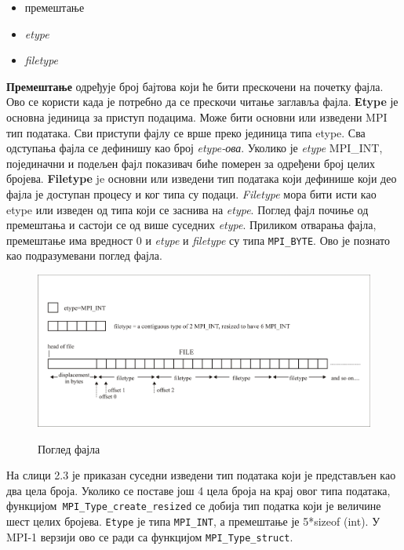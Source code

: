 \begin{itemize}
\item премештање
\item \textit{etype}
\item \textit{filetype}
\end{itemize}

\textbf{Премештање} одређује број бајтова који ће бити прескочени на почетку фајла. Ово се користи када је потребно да се прескочи читање заглавља фајла.
\textbf{Еtype} је основна јединица за приступ подацима. Може бити основни или изведени MPI тип података. Сви приступи фајлу се врше преко јединица типа etype. Сва одступања фајла се дефинишу као број \textit{ etype-ова}. Уколико је \textit{etype} MPI\_INT, појединачни и подељен фајл показивач биће померен за одређени број целих бројева.
\textbf{Filetype} je основни или изведени тип података који дефинише који део фајла је доступан процесу и ког типа су подаци. \textit{Filetype} мора бити исти као etype или изведен од типа који се заснива на \textit{etype}.
Поглед фајл почиње од премештања и састоји се од више суседних \textit{etype}. Приликом отварања фајла, премештање има вредност 0  и \textit{etype} и \textit{filetype} су типа \texttt{MPI\_BYTE}. Ово је познато као подразумевани поглед фајла. 

\begin{figure}[h!]
  \centering
      \includegraphics[width=1\textwidth]{slike/displacement.png}\\[1cm]
  \caption{Поглед фајла}
\end{figure}

На слици 2.3 је приказан суседни изведени тип података који је представљен као два цела броја. Уколико се поставе још 4 цела броја на крај овог типа података, функцијом\texttt{ MPI\_Type\_create\_resized} се добија тип податка који је величине шест целих бројева. \texttt{Еtype} је типа \texttt{MPI\_INT}, а премештање је 5*sizeof (int). У MPI-1 верзији ово се ради са функцијом \texttt{MPI\_Type\_struct}.

